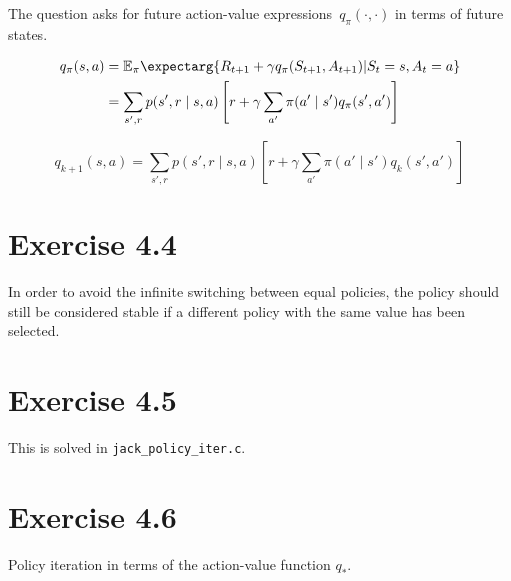 \documentclass[a4paper, 12pt, titlepage]{article}
\newcommand{\exppi}{\mathbb{E}_\pi\expectarg}
\newcommand{\q}[2]{q_\pi(#1, #2)}
\newcommand{\pol}[2]{\pi(#1 \mid{} #2)}
\begin{document}
The question asks for future action-value expressions~$\q{\cdot}{\cdot}$ in
terms of future states.

\begin{align*}
        \q{s}{a} &= \exppi{R_{t + 1} + \gamma \q{S_{t + 1}}{A_{t + 1}} | S_t = s, A_t = a} \\
                 &= \sum_{s', r} p(s', r \mid s, a) \left[r + \gamma \sum_{a'} \pol{a'}{s'} \q{s'}{a'}\right]
\end{align*}

\begin{equation*}
        q_{k + 1}(s, a) = \sum_{s', r} p(s', r \mid s, a) \left[r + \gamma \sum_{a'} \pol{a'}{s'} q_k(s', a')\right]
\end{equation*}


\section{Exercise 4.4}

In order to avoid the infinite switching between equal policies, the policy
should still be considered stable if a different policy with the same value has
been selected.


\section{Exercise 4.5}

This is solved in \verb|jack_policy_iter.c|.


\section{Exercise 4.6}

Policy iteration in terms of the action-value function $q_*$.
\end{document}
